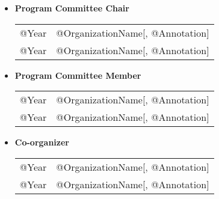 \documentclass[10pt]{article}
\begin{document}
\begin{itemize}
\item[] \textbf{Program Committee Chair}
\\[1.3ex]
\begin{tabular}{l@{\quad\ }p{38em}} 
 @Year & @OrganizationName[, @Annotation]
 \\[.5ex]
 @Year & @OrganizationName[, @Annotation]
\end{tabular}

\item[] \textbf{Program Committee Member}
\\[1.3ex]
\begin{tabular}{l@{\quad\ }p{38em}} 
 @Year & @OrganizationName[, @Annotation]
 \\[.5ex]
 @Year & @OrganizationName[, @Annotation]
\end{tabular}

\item[] \textbf{Co-organizer}
\\[1.3ex]
\begin{tabular}{l@{\quad\ }p{38em}} 
 @Year & @OrganizationName[, @Annotation]
 \\[.5ex]
 @Year & @OrganizationName[, @Annotation]
\end{tabular}

\end{itemize}
\end{document}
